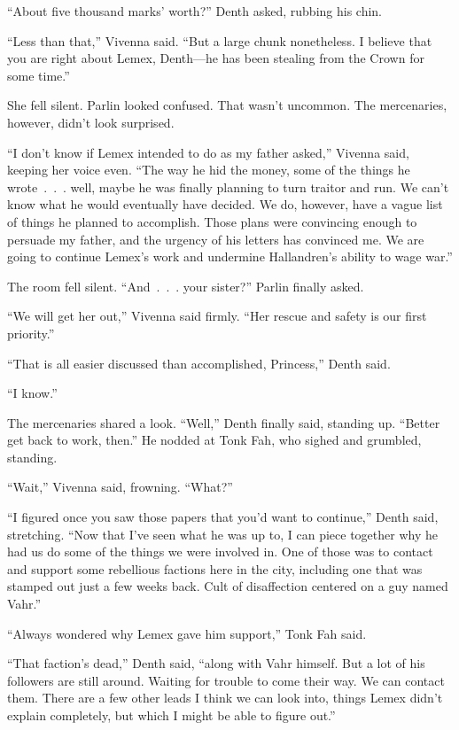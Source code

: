 “About five thousand marks’ worth?” Denth asked, rubbing his chin.

“Less than that,” Vivenna said. “But a large chunk nonetheless. I believe that you are right about Lemex, Denth—he has been stealing from the Crown for some time.”

She fell silent. Parlin looked confused. That wasn’t uncommon. The mercenaries, however, didn’t look surprised.

“I don’t know if Lemex intended to do as my father asked,” Vivenna said, keeping her voice even. “The way he hid the money, some of the things he wrote~.~.~. well, maybe he was finally planning to turn traitor and run. We can’t know what he would eventually have decided. We do, however, have a vague list of things he planned to accomplish. Those plans were convincing enough to persuade my father, and the urgency of his letters has convinced me. We are going to continue Lemex’s work and undermine Hallandren’s ability to wage war.”

The room fell silent. “And~.~.~. your sister?” Parlin finally asked.

“We will get her out,” Vivenna said firmly. “Her rescue and safety is our first priority.”

“That is all easier discussed than accomplished, Princess,” Denth said.

“I know.”

The mercenaries shared a look. “Well,” Denth finally said, standing up. “Better get back to work, then.” He nodded at Tonk Fah, who sighed and grumbled, standing.

“Wait,” Vivenna said, frowning. “What?”

“I figured once you saw those papers that you’d want to continue,” Denth said, stretching. “Now that I’ve seen what he was up to, I can piece together why he had us do some of the things we were involved in. One of those was to contact and support some rebellious factions here in the city, including one that was stamped out just a few weeks back. Cult of disaffection centered on a guy named Vahr.”

“Always wondered why Lemex gave him support,” Tonk Fah said.

“That faction’s dead,” Denth said, “along with Vahr himself. But a lot of his followers are still around. Waiting for trouble to come their way. We can contact them. There are a few other leads I think we can look into, things Lemex didn’t explain completely, but which I might be able to figure out.”

